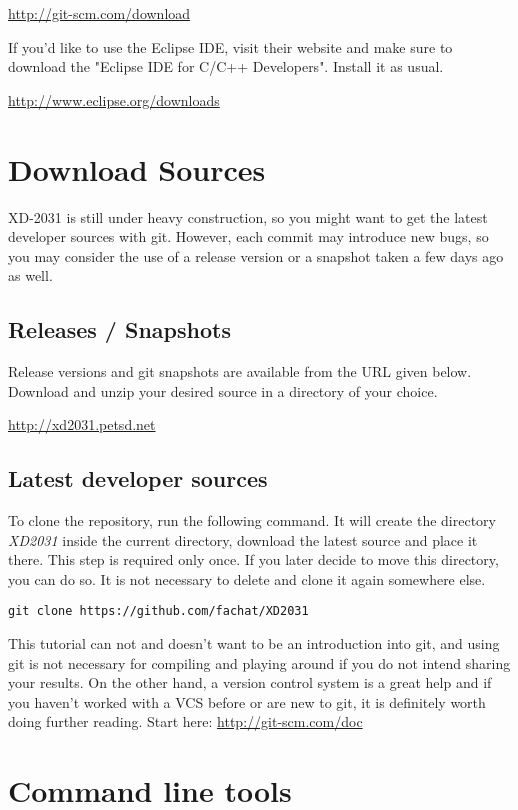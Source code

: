 \url{http://git-scm.com/download}

If you'd like to use the Eclipse IDE, visit their website  
and make sure to download the "Eclipse IDE for C/C++ Developers". 
Install it as usual.

\url{http://www.eclipse.org/downloads} 

\section{Download Sources}

XD-2031 is still under heavy construction, so you might want 
to get the latest developer sources with git. However, each commit may
introduce new bugs, so you may consider the use of a release version or
a snapshot taken a few days ago as well.

\subsection{Releases / Snapshots}
Release versions and git snapshots are available from the URL given below. 
Download and unzip your desired source in a directory of your choice.

\url{http://xd2031.petsd.net}


\subsection{Latest developer sources}

To clone the repository, run the following command. It will create the directory 
\textit{XD2031} inside the current directory, download the latest source and place it there.
This step is required only once. If you later decide to move this directory, you can do so.
It is not necessary to delete and clone it again somewhere else.

\begin{verbatim}
git clone https://github.com/fachat/XD2031
\end{verbatim}

This tutorial can not and doesn't want to be an introduction into git,
and using git is not necessary for compiling and playing around if you
do not intend sharing your results. On the other hand, a version control system is
a great help and if you haven't worked with a VCS before or are new to git, it is definitely 
worth doing further reading. 
Start here: \url{http://git-scm.com/doc}

\section{Command line tools}
